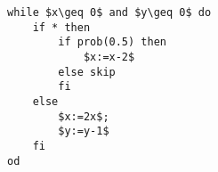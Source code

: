 \lstset{language=affprob}
\lstset{tabsize=3}
\newsavebox{\invrun}
\begin{lrbox}{\invrun}
\begin{lstlisting}[mathescape]
while $x\geq 0$ and $y\geq 0$ do
	if * then
		if prob(0.5) then 
			$x:=x-2$ 
		else skip 
		fi
	else 
		$x:=2x$;
		$y:=y-1$
	fi
od
\end{lstlisting}
\end{lrbox}
\begin{figure}[t]
	\begin{subfigure}{0.45\textwidth}
\centering
\usebox{\invrun}
\end{subfigure}
\begin{subfigure}{0.45\textwidth}
	\centering
\begin{tikzpicture}
%


\end{tikzpicture}
\end{subfigure}
\end{figure}

